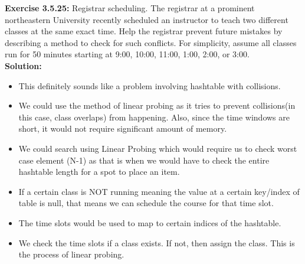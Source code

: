 \documentclass[11pt,fleqn]{article}
\begin{document}
\textbf{Exercise 3.5.25:} Registrar scheduling. The registrar at a prominent northeastern University recently
scheduled an instructor to teach two different classes at the same exact time. Help
the registrar prevent future mistakes by describing a method to check for such conflicts.
For simplicity, assume all classes run for 50 minutes starting at 9:00, 10:00, 11:00, 1:00,
2:00, or 3:00.\\

\textbf{Solution:}\\
\begin{itemize}
	\item This definitely sounds like a problem involving hashtable with collisions.
	
	\item We could use the method of linear probing as it tries to prevent collisions(in this case, class overlaps) from happening. Also, since the time windows are short, it would not require significant amount of memory.
	
	\item We could search using Linear Probing which would require us to check worst case element (N-1) as that is when we would have to check the entire hashtable length for a spot to place an item.
	
	\item If a certain class is NOT running meaning the value at a certain key/index of table is null, that means we can schedule the course for that time slot.
	
	\item The time slots would be used to map to certain indices of the hashtable.
	
	\item We check the time slots if a class exists. If not, then assign the class. This is the process of linear probing.
\end{itemize}
\end{document}
